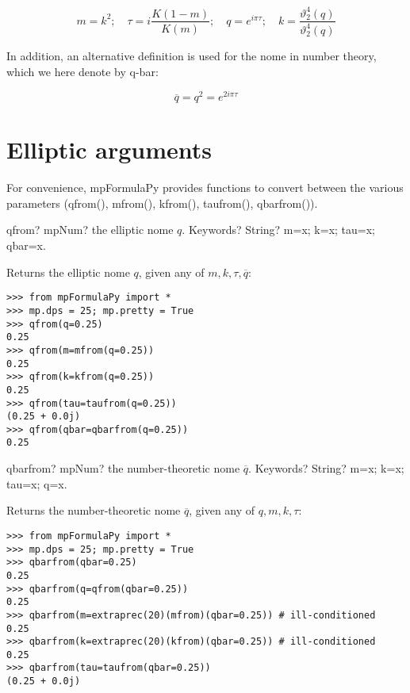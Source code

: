 \begin{equation}
m=k^2; \quad \tau=i \frac{K(1-m)}{K(m)}; \quad q=e^{i \pi \tau}; \quad k=\frac{\vartheta_2^4(q)}{\vartheta_2^4(q)}
\end{equation}

In addition, an alternative definition is used for the nome in number theory, which we here denote by q-bar:

\begin{equation}
\overline{q} = q^2 = e^{2 i \pi \tau}
\end{equation}

\section{Elliptic arguments}

For convenience, mpFormulaPy provides functions to convert between the various parameters (qfrom(), mfrom(), kfrom(), taufrom(), qbarfrom()).


\vspace{0.6cm}

\begin{mpFunctionsExtract}
	\mpFunctionOne
	{qfrom? mpNum? the elliptic nome $q$.}
	{Keywords? String? m=x; k=x; tau=x; qbar=x.}
\end{mpFunctionsExtract}

\vpara
Returns the elliptic nome $q$, given any of $m, k, \tau, \overline{q}$:

\begin{lstlisting}
>>> from mpFormulaPy import *
>>> mp.dps = 25; mp.pretty = True
>>> qfrom(q=0.25)
0.25
>>> qfrom(m=mfrom(q=0.25))
0.25
>>> qfrom(k=kfrom(q=0.25))
0.25
>>> qfrom(tau=taufrom(q=0.25))
(0.25 + 0.0j)
>>> qfrom(qbar=qbarfrom(q=0.25))
0.25
\end{lstlisting}


\vspace{0.6cm}

\begin{mpFunctionsExtract}
	\mpFunctionOne
	{qbarfrom? mpNum? the number-theoretic nome $\overline{q}$.}
	{Keywords? String? m=x; k=x; tau=x; q=x.}
\end{mpFunctionsExtract}

\vpara
Returns the number-theoretic nome $\overline{q}$, given any of $q, m, k, \tau$:

\begin{lstlisting}
>>> from mpFormulaPy import *
>>> mp.dps = 25; mp.pretty = True
>>> qbarfrom(qbar=0.25)
0.25
>>> qbarfrom(q=qfrom(qbar=0.25))
0.25
>>> qbarfrom(m=extraprec(20)(mfrom)(qbar=0.25)) # ill-conditioned
0.25
>>> qbarfrom(k=extraprec(20)(kfrom)(qbar=0.25)) # ill-conditioned
0.25
>>> qbarfrom(tau=taufrom(qbar=0.25))
(0.25 + 0.0j)
\end{lstlisting}



